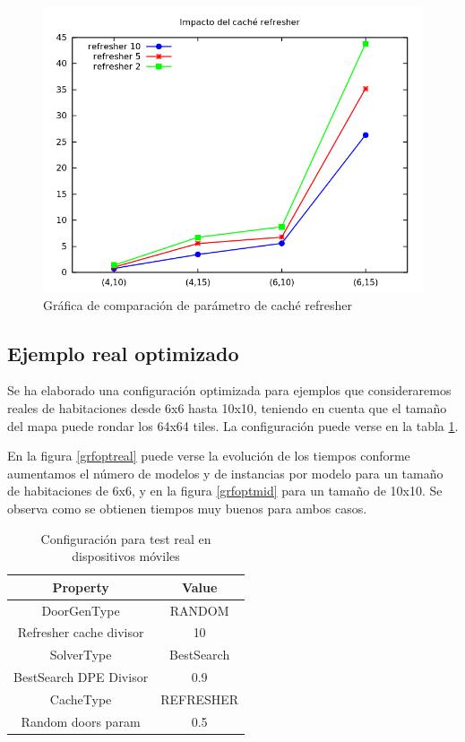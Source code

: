 \begin{figure}[H]
\centering
\includegraphics[scale=0.5]{img/refresher}
\caption{Gráfica de comparación de parámetro de caché refresher
\label{fig:grfrefresher}}
\end{figure}



\subsection{Ejemplo real optimizado}

Se ha elaborado una configuración optimizada para ejemplos que consideraremos reales de habitaciones desde 6x6 hasta 10x10, teniendo en cuenta que el tamaño del mapa puede rondar los 64x64 tiles. La configuración puede verse en la tabla \ref{table:cfg-optreal}.

En la figura \ref{grfoptreal} puede verse la evolución de los tiempos conforme aumentamos el número de modelos y de instancias por modelo para un tamaño de habitaciones de 6x6, y en la figura \ref{grfoptmid} para un tamaño de 10x10. Se observa como se obtienen tiempos muy buenos para ambos casos.

\begin{table}[H]
\begin{center}
	\begin{tabular}{ | c | c | }
\hline
 		Property & Value \\ \hline
DoorGenType & RANDOM \\ 
Refresher cache divisor & 10 \\ 
SolverType & BestSearch \\ 
BestSearch DPE Divisor & 0.9 \\ 
CacheType & REFRESHER \\ 
Random doors param & 0.5 \\ 
\hline
	\end{tabular}
\end{center}
\caption{Configuración para test real en dispositivos móviles}
\label{table:cfg-optreal}
\end{table}


